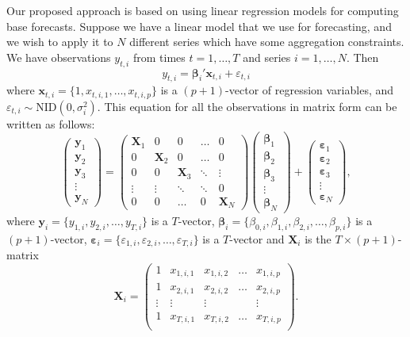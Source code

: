 \documentclass[11pt,a4paper,]{article}
\begin{document}
Our proposed approach is based on using linear regression models for
computing base forecasts. Suppose we have a linear model that we use for
forecasting, and we wish to apply it to \(N\) different series which
have some aggregation constraints. We have observations \(y_{t,i}\) from
times \(t=1,\dots,T\) and series \(i=1,\dots,N\). Then \begin{equation}
y_{t,i} = \bm{\beta}_{i}' \bm{x}_{t,i} + \varepsilon_{t,i}
\end{equation} where \(\bm{x}_{t,i}=\{1, x_{t,i,1},\dots,x_{t,i,p}\}\)
is a \((p+1)\)-vector of regression variables, and
\(\varepsilon_{t,i}\sim \text{NID}(0,\sigma_i^2)\). This equation for
all the observations in matrix form can be written as follows:
\begin{equation}\label{eq:linearmodel}
\begin{pmatrix}
\bm{y}_1\\
\bm{y}_2\\
\bm{y}_3 \\
\vdots\\
\bm{y}_N
\end{pmatrix}=
\begin{pmatrix}
\bm{X}_1 & 0        & 0       & \dots  & 0\\
0        & \bm{X}_2 & 0        & \dots  & 0\\
0        & 0        & \bm{X}_3 & \ddots & \vdots \\
\vdots   & \vdots   & \ddots   & \ddots & 0\\
0        & 0    & \dots    & 0      & \bm{X}_N
\end{pmatrix}
\begin{pmatrix}
\bm{\beta}_1\\
\bm{\beta}_2\\
\bm{\beta}_3\\
\vdots\\
\bm{\beta}_N
\end{pmatrix}+
\begin{pmatrix}
\bm{\varepsilon}_1\\
\bm{\varepsilon}_2\\
\bm{\varepsilon}_3\\
\vdots \\
\bm{\varepsilon}_N
\end{pmatrix},
\end{equation} where \(\bm{y}_i = \{y_{1,i}, y_{2,i}, \dots, y_{T,i}\}\)
is a \(T\)-vector,
\({\bm{\beta}}_i = \{\beta_{0,i}, \beta_{1,i}, \beta_{2,i}, \dots, \beta_{p,i}\}\)
is a \((p+1)\)-vector,
\({\bm{\varepsilon}}_i = \{\varepsilon_{1,i}, \varepsilon_{2,i}, \dots, \varepsilon_{T,i}\}\)
is a \(T\)-vector and \(\bm{X}_i\) is the \(T\times (p+1)\)-matrix
\begin{equation}
\bm{X}_i = \begin{pmatrix}
1 & x_{1,i,1} & x_{1,i,2} & \dots & x_{1,i,p}\\
1 & x_{2,i,1} & x_{2,i,2} & \dots & x_{2,i,p}\\
\vdots & \vdots & \vdots & & \vdots \\
1 & x_{T,i,1} & x_{T,i,2} & \dots & x_{T,i,p}\\
\end{pmatrix}.
\end{equation}
\end{document}
